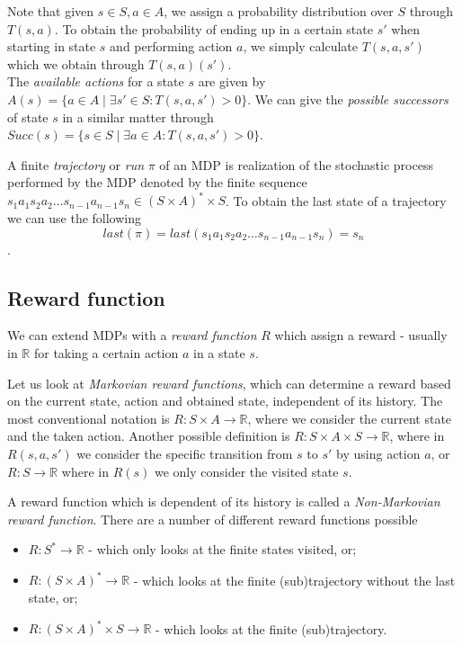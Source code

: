 Note that given $s\in S,a\in A$, we assign a probability distribution over $S$ through $T(s,a)$. To obtain the probability of ending up in a certain state $s'$ when starting in state $s$ and performing action $a$, we simply calculate $T(s,a,s')$ which we obtain through $T(s,a)(s')$.\\

The \textit{available actions} for a state $s$ are given by $A(s)=\{a\in A\mid \exists s'\in S: T(s,a,s')>0\}$. We can give the \textit{possible successors} of state $s$ in a similar matter through $Succ(s)=\{s\in S\mid\exists a\in A : T(s,a,s')>0\}$.

A finite \textit{trajectory} or \textit{run} $\pi$ of an MDP is realization of the stochastic process performed by the MDP denoted by the finite sequence $s_1 a_1 s_2 a_2\dots s_{n-1} a_{n-1} s_n \in (S\times A)^*\times S$. To obtain the last state of a trajectory we can use the following \[last(\pi)=last(s_1 a_1 s_2 a_2\dots s_{n-1} a_{n-1} s_n)=s_n\].

\subsection*{Reward function}
We can extend MDPs with a \textit{reward function} $R$ which assign a reward - usually in $\mathbb{R}$ for taking a certain action $a$ in a state $s$. 


Let us look at \textit{Markovian reward functions}, which can determine a reward based on the current state, action and obtained state, independent of its history. The most conventional notation is $R:S\times A\to \mathbb{R}$, where we consider the current state and the taken action. Another possible definition is $R:S\times A\times S\to\mathbb{R}$, where  in $R(s,a,s')$ we consider the specific transition from $s$ to $s'$ by using action $a$, or $R:S\to\mathbb{R}$ where in $R(s)$ we only consider the visited state $s$. 


A reward function which is dependent of its history is called a \textit{Non-Markovian reward function}. There are a number of different reward functions possible
\begin{itemize}
	\item $R:S^*\to\mathbb{R}$ - which only looks at the finite states visited, or;
	\item $R:(S\times A)^*\to\mathbb{R}$ - which looks at the finite (sub)trajectory without the last state, or;
	\item $R:(S\times A)^*\times S\to \mathbb{R}$ - which looks at the finite (sub)trajectory.
\end{itemize}

